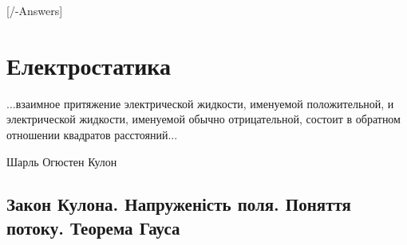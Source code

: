 
[\currfilebase/\currfilebase-Answers]
\chapter{Електростатика}\label{\currfilebase}
\epigraph{\Annabelle  ...взаимное притяжение электрической жидкости, именуемой положительной, и электрической жидкости, именуемой обычно отрицательной, состоит в обратном отношении квадратов расстояний... 
}{Шарль Огюстен Кулон}


\section{Закон Кулона. Напруженість поля. Поняття потоку. Теорема Гауса}

